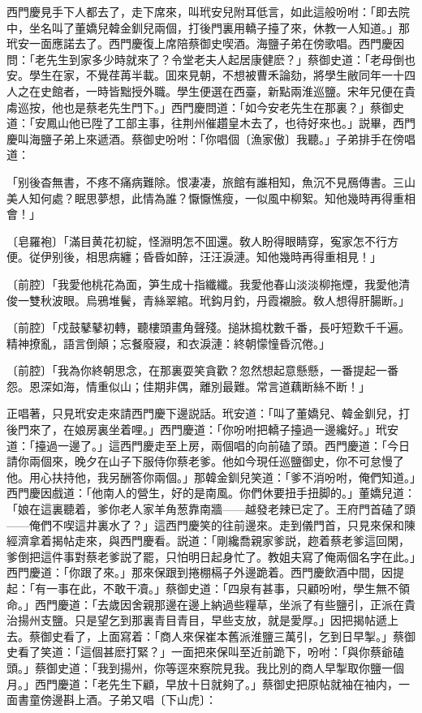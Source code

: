 西門慶見手下人都去了，走下席來，叫玳安兒附耳低言，如此這般吩咐：「即去院中，坐名叫了董嬌兒韓金釧兒兩個，打後門裏用轎子擡了來，休教一人知道。」那玳安一面應諾去了。西門慶復上席陪蔡御史喫酒。海鹽子弟在傍歌唱。西門慶因問：「老先生到家多少時就來了？令堂老夫人起居康健麽？」蔡御史道：「老母倒也安。學生在家，不覺荏苒半載。囬來見朝，不想被曹禾論劾，將學生敝同年一十四人之在史館者，一時皆黜授外職。學生便選在西臺，新點兩淮巡鹽。宋年兄便在貴䖏巡按，他也是蔡老先生門下。」西門慶問道：「如今安老先生在那裏？」蔡御史道：「安鳳山他已陞了工部主事，往荆州催趲皇木去了，也待好來也。」説畢，西門慶叫海鹽子弟上來遞酒。蔡御史吩咐：「你唱個〔漁家傲〕我聽。」子弟排手在傍唱道：

\begin{myquote}
「别後杳無書，不疼不痛病難除。恨凄凄，旅館有誰相知，魚沉不見鴈傳書。三山美人知何處？眠思夢想，此情為誰？懨懨憔瘦，一似風中柳絮。知他幾時再得重相會！」

{\markfont〔皂羅袍〕}「滿目黄花初綻，怪淵明怎不囬還。敎人盼得眼睛穿，寃家怎不行方便。従伊别後，相思病纏；昏昏如醉，汪汪淚漣。知他幾時再得重相見！」

{\markfont〔前腔〕}「我愛他桃花為面，笋生成十指纖纖。我愛他春山淡淡柳拖煙，我愛他清俊一雙秋波眼。烏鴉堆鬢，青絲翠綰。玳鈎月釣，丹霞襯臉。敎人想得肝腸断。」

{\markfont〔前腔〕}「戍鼓鼕鼕初轉，聽樓頭畫角聲殘。搥牀搗枕數千番，長吁短歎千千遍。精神撩亂，語言倒顛；忘餐廢寢，和衣淚漣：終朝懞憧昏沉倦。」

{\markfont〔前腔〕}「我為你終朝思念，在那裏耍笑貪歡？忽然想起意懸懸，一番提起一番怨。恩深如海，情重似山；佳期非偶，離別最難。常言道藕断絲不断！」
\end{myquote}

正唱著，只見玳安走來請西門慶下邊説話。玳安道：「叫了董嬌兒、韓金釧兒，打後門來了，在娘房裏坐着哩。」西門慶道：「你吩咐把轎子擡過一邊纔好。」玳安道：「擡過一邊了。」這西門慶走至上房，兩個唱的向前磕了頭。西門慶道：「今日請你兩個來，晚夕在山子下服侍你蔡老爹。他如今現任巡鹽御史，你不可怠慢了他。用心扶持他，我另酬答你兩個。」那韓金釧兒笑道：「爹不消吩咐，俺們知道。」西門慶因戲道：「他南人的營生，好的是南風。你們休要扭手扭脚的。」董嬌兒道：「娘在這裏聽着，爹你老人家羊角葱靠南牆——越發老辣已定了。王府門首磕了頭——俺們不喫這井裏水了？」這西門慶笑的往前邊來。走到儀門首，只見來保和陳經濟拿着揭帖走來，與西門慶看。説道：「剛纔喬親家爹説，趂着蔡老爹這回閑，爹倒把這件事對蔡老爹説了罷，只怕明日起身忙了。教姐夫寫了俺兩個名字在此。」西門慶道：「你跟了來。」那來保跟到捲棚槅子外邊跪着。西門慶飲酒中間，因提起：「有一事在此，不敢干凟。」蔡御史道：「四泉有甚事，只顧吩咐，學生無不領命。」西門慶道：「去歲因舍親那邊在邊上納過些糧草，坐派了有些鹽引，正派在貴治揚州支鹽。只是望乞到那裏青目青目，早些支放，就是愛厚。」因把揭帖遞上去。蔡御史看了，上面寫着：「商人來保崔本舊派淮鹽三萬引，乞到日早掣。」蔡御史看了笑道：「這個甚麽打緊？」一面把來保叫至近前跪下，吩咐：「與你蔡爺磕頭。」蔡御史道：「我到揚州，你等逕來察院見我。我比別的商人早掣取你鹽一個月。」西門慶道：「老先生下顧，早放十日就夠了。」蔡御史把原帖就袖在袖内，一面書童傍邊斟上酒。子弟又唱〔下山虎〕：

